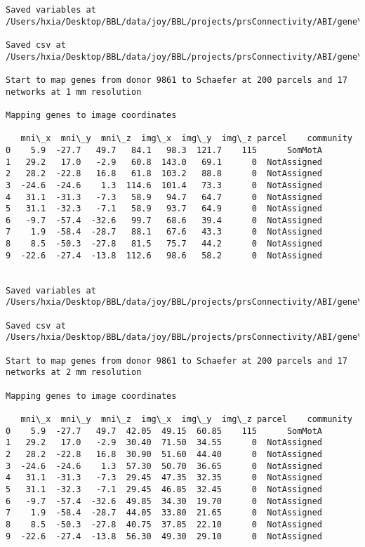 \documentclass[11pt]{article}
\begin{document}
\begin{Verbatim}[commandchars=\\\{\}]
Saved variables at /Users/hxia/Desktop/BBL/data/joy/BBL/projects/prsConnectivity/ABI/gene\_mapping/9861donor\_200Parcels\_7Network\_2mm.pkl

Saved csv at /Users/hxia/Desktop/BBL/data/joy/BBL/projects/prsConnectivity/ABI/gene\_mapping/9861donor\_200Parcels\_7Network\_2mm.csv

Start to map genes from donor 9861 to Schaefer at 200 parcels and 17 networks at 1 mm resolution

Mapping genes to image coordinates

   mni\_x  mni\_y  mni\_z  img\_x  img\_y  img\_z parcel    community
0    5.9  -27.7   49.7   84.1   98.3  121.7    115      SomMotA
1   29.2   17.0   -2.9   60.8  143.0   69.1      0  NotAssigned
2   28.2  -22.8   16.8   61.8  103.2   88.8      0  NotAssigned
3  -24.6  -24.6    1.3  114.6  101.4   73.3      0  NotAssigned
4   31.1  -31.3   -7.3   58.9   94.7   64.7      0  NotAssigned
5   31.1  -32.3   -7.1   58.9   93.7   64.9      0  NotAssigned
6   -9.7  -57.4  -32.6   99.7   68.6   39.4      0  NotAssigned
7    1.9  -58.4  -28.7   88.1   67.6   43.3      0  NotAssigned
8    8.5  -50.3  -27.8   81.5   75.7   44.2      0  NotAssigned
9  -22.6  -27.4  -13.8  112.6   98.6   58.2      0  NotAssigned


Saved variables at /Users/hxia/Desktop/BBL/data/joy/BBL/projects/prsConnectivity/ABI/gene\_mapping/9861donor\_200Parcels\_17Network\_1mm.pkl

Saved csv at /Users/hxia/Desktop/BBL/data/joy/BBL/projects/prsConnectivity/ABI/gene\_mapping/9861donor\_200Parcels\_17Network\_1mm.csv

Start to map genes from donor 9861 to Schaefer at 200 parcels and 17 networks at 2 mm resolution

Mapping genes to image coordinates

   mni\_x  mni\_y  mni\_z  img\_x  img\_y  img\_z parcel    community
0    5.9  -27.7   49.7  42.05  49.15  60.85    115      SomMotA
1   29.2   17.0   -2.9  30.40  71.50  34.55      0  NotAssigned
2   28.2  -22.8   16.8  30.90  51.60  44.40      0  NotAssigned
3  -24.6  -24.6    1.3  57.30  50.70  36.65      0  NotAssigned
4   31.1  -31.3   -7.3  29.45  47.35  32.35      0  NotAssigned
5   31.1  -32.3   -7.1  29.45  46.85  32.45      0  NotAssigned
6   -9.7  -57.4  -32.6  49.85  34.30  19.70      0  NotAssigned
7    1.9  -58.4  -28.7  44.05  33.80  21.65      0  NotAssigned
8    8.5  -50.3  -27.8  40.75  37.85  22.10      0  NotAssigned
9  -22.6  -27.4  -13.8  56.30  49.30  29.10      0  NotAssigned



\end{Verbatim}
\end{document}
